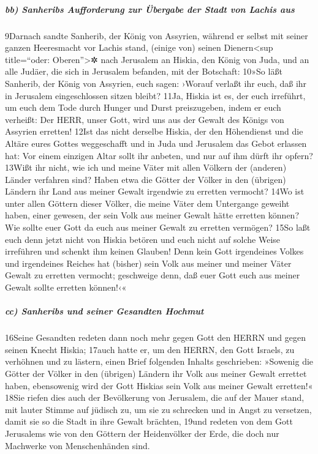 \hypertarget{bb-sanheribs-aufforderung-zur-uxfcbergabe-der-stadt-von-lachis-aus}{%
\subparagraph{bb) Sanheribs Aufforderung zur Übergabe der Stadt von
Lachis
aus}\label{bb-sanheribs-aufforderung-zur-uxfcbergabe-der-stadt-von-lachis-aus}}

9Darnach sandte Sanherib, der König von Assyrien, während er selbst mit
seiner ganzen Heeresmacht vor Lachis stand, (einige von) seinen
Dienern\textless sup title=``oder: Oberen''\textgreater✲ nach Jerusalem
an Hiskia, den König von Juda, und an alle Judäer, die sich in Jerusalem
befanden, mit der Botschaft: 10»So läßt Sanherib, der König von
Assyrien, euch sagen: ›Worauf verlaßt ihr euch, daß ihr in Jerusalem
eingeschlossen sitzen bleibt? 11Ja, Hiskia ist es, der euch irreführt,
um euch dem Tode durch Hunger und Durst preiszugeben, indem er euch
verheißt: Der HERR, unser Gott, wird uns aus der Gewalt des Königs von
Assyrien erretten! 12Ist das nicht derselbe Hiskia, der den Höhendienst
und die Altäre eures Gottes weggeschafft und in Juda und Jerusalem das
Gebot erlassen hat: Vor einem einzigen Altar sollt ihr anbeten, und nur
auf ihm dürft ihr opfern? 13Wißt ihr nicht, wie ich und meine Väter mit
allen Völkern der (anderen) Länder verfahren sind? Haben etwa die Götter
der Völker in den (übrigen) Ländern ihr Land aus meiner Gewalt irgendwie
zu erretten vermocht? 14Wo ist unter allen Göttern dieser Völker, die
meine Väter dem Untergange geweiht haben, einer gewesen, der sein Volk
aus meiner Gewalt hätte erretten können? Wie sollte euer Gott da euch
aus meiner Gewalt zu erretten vermögen? 15So laßt euch denn jetzt nicht
von Hiskia betören und euch nicht auf solche Weise irreführen und
schenkt ihm keinen Glauben! Denn kein Gott irgendeines Volkes und
irgendeines Reiches hat (bisher) sein Volk aus meiner und meiner Väter
Gewalt zu erretten vermocht; geschweige denn, daß euer Gott euch aus
meiner Gewalt sollte erretten können!‹«

\hypertarget{cc-sanheribs-und-seiner-gesandten-hochmut}{%
\subparagraph{cc) Sanheribs und seiner Gesandten
Hochmut}\label{cc-sanheribs-und-seiner-gesandten-hochmut}}

16Seine Gesandten redeten dann noch mehr gegen Gott den HERRN und gegen
seinen Knecht Hiskia; 17auch hatte er, um den HERRN, den Gott Israels,
zu verhöhnen und zu lästern, einen Brief folgenden Inhalts geschrieben:
»Sowenig die Götter der Völker in den (übrigen) Ländern ihr Volk aus
meiner Gewalt errettet haben, ebensowenig wird der Gott Hiskias sein
Volk aus meiner Gewalt erretten!« 18Sie riefen dies auch der Bevölkerung
von Jerusalem, die auf der Mauer stand, mit lauter Stimme auf jüdisch
zu, um sie zu schrecken und in Angst zu versetzen, damit sie so die
Stadt in ihre Gewalt brächten, 19und redeten von dem Gott Jerusalems wie
von den Göttern der Heidenvölker der Erde, die doch nur Machwerke von
Menschenhänden sind.


